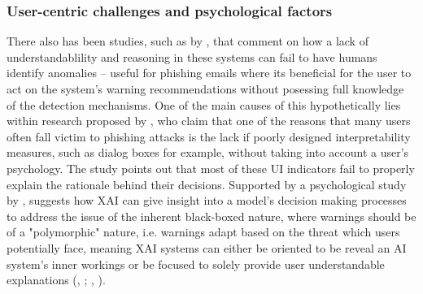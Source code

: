 
\subsubsection*{User-centric challenges and psychological factors}
There also has been studies, such as by \cite{vo2024securing}, that comment on how a lack of understandablility and reasoning in these systems can fail to have humans identify anomalies -- useful for phishing emails where its beneficial for the user to act on the system's warning recommendations without posessing full knowledge of the detection mechanisms. One of the main causes of this hypothetically lies within research proposed by \cite{greco2023explaining}, who claim that one of the reasons that many users often fall victim to phishing attacks is the lack if poorly designed interpretability measures, such as dialog boxes for example, without taking into account a user's psychology. The study points out that most of these UI indicators fail to properly explain the rationale behind their decisions. Supported by a psychological study by \cite{anderson2015polymorphic}, suggests how XAI can give insight into a model's decision making processes to address the issue of the inherent black-boxed nature, where warnings should be of a "polymorphic" nature, i.e. warnings adapt based on the threat which users potentially face, meaning XAI systems can either be oriented to be reveal an AI system's inner workings or be focused to solely provide user understandable explanations (\citeauthor{lipton2018mythos}, \citeyear{lipton2018mythos}; \citeauthor{ribeiro2016model}, \citeyear{ribeiro2016model}).
